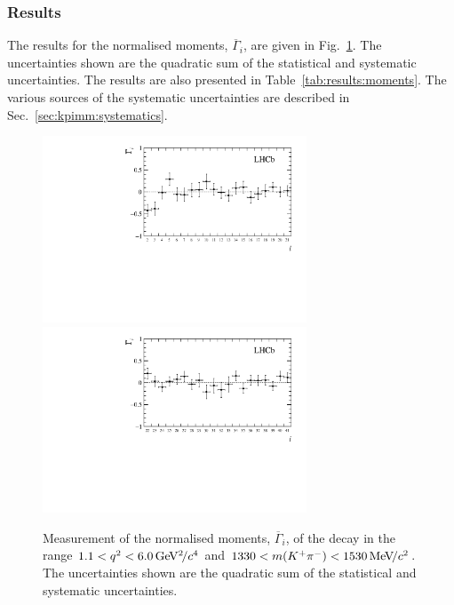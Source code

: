 \subsubsection{Results}

The results for the normalised moments, $\overline{\Gamma}_{i}$, are given in Fig.~\ref{fig:results:moments}. The uncertainties shown are the quadratic sum of the statistical and systematic uncertainties. The results are also presented in Table~\ref{tab:results:moments}. The various sources of the systematic uncertainties are described in Sec.~\ref{sec:kpimm:systematics}.

\begin{figure}[!tb]
\centering
  \includegraphics[width=0.7\textwidth]{figs/kpimm/angular-analysis/mom_results_2_21.pdf}
  \includegraphics[width=0.7\textwidth]{figs/kpimm/angular-analysis/mom_results_22_41.pdf}
  \caption{Measurement of the normalised moments, $\overline{\Gamma}_{i}$, of the decay \BdToKpimm in the range $1.1<{q^2}<6.0{\mathrm{\,Ge\kern -0.1em V^2\!/}c^4}$ and $1330<m({{K}^+}{{\pi}^-})<1530{\mathrm{\,Me\kern -0.1em V\!/}c^2}$. The uncertainties shown are the quadratic sum of the statistical and systematic uncertainties.}
  \label{fig:results:moments}
\end{figure}

